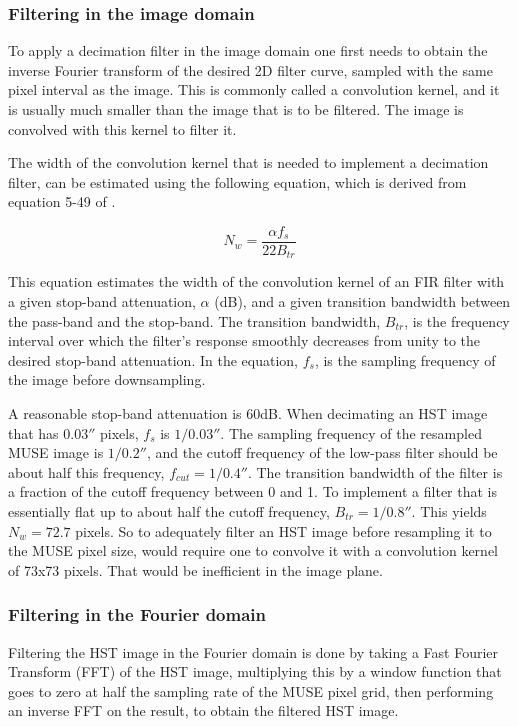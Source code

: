 \documentclass[12pt,twoside,a4paper]{article}
\newcommand{\arcsec}{''}
\begin{document}
\subsubsection{Filtering in the image domain}

To apply a decimation filter in the image domain one first needs to
obtain the inverse Fourier transform of the desired 2D filter curve,
sampled with the same pixel interval as the image. This is commonly
called a convolution kernel, and it is usually much smaller than the
image that is to be filtered. The image is convolved with this kernel
to filter it.

The width of the convolution kernel that is needed to implement a
decimation filter, can be estimated using the following equation,
which is derived from equation 5-49 of \cite{lyons2011}.

\begin{equation}
  N_w = \frac{\alpha f_s} {22 B_{tr}}
\end{equation}

This equation estimates the width of the convolution kernel of an FIR
filter with a given stop-band attenuation, $\alpha$ (dB), and a given
transition bandwidth between the pass-band and the stop-band. The
transition bandwidth, $B_{tr}$, is the frequency interval over which
the filter's response smoothly decreases from unity to the desired
stop-band attenuation. In the equation, $f_s$, is the sampling
frequency of the image before downsampling.

A reasonable stop-band attenuation is 60dB. When decimating an HST
image that has $0.03\arcsec$ pixels, $f_s$ is $1/0.03\arcsec$. The
sampling frequency of the resampled MUSE image is $1/0.2\arcsec$, and
the cutoff frequency of the low-pass filter should be about half this
frequency, $f_{cut}=1/0.4\arcsec$. The transition bandwidth of the
filter is a fraction of the cutoff frequency between 0 and 1. To
implement a filter that is essentially flat up to about half the
cutoff frequency, $B_{tr} =1/0.8\arcsec$. This yields $N_w = 72.7$
pixels. So to adequately filter an HST image before resampling it to
the MUSE pixel size, would require one to convolve it with a
convolution kernel of 73x73 pixels. That would be inefficient in the
image plane.

\subsubsection{Filtering in the Fourier domain}

Filtering the HST image in the Fourier domain is done by taking a Fast
Fourier Transform (FFT) of the HST image, multiplying this by a window
function that goes to zero at half the sampling rate of the MUSE pixel
grid, then performing an inverse FFT on the result, to obtain the
filtered HST image.
\end{document}
